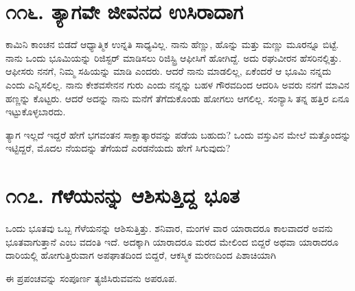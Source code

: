 \section{\num{೧೧೬. } ತ್ಯಾಗವೇ ಜೀವನದ ಉಸಿರಾದಾಗ}

ಕಾಮಿನಿ ಕಾಂಚನ ಬಿಡದೆ ಆಧ್ಯಾತ್ಮಿಕ ಉನ್ನತಿ ಸಾಧ್ಯವಿಲ್ಲ. ನಾನು ಹೆಣ್ಣು, ಹೊನ್ನು ಮತ್ತು ಮಣ್ಣು ಮೂರನ್ನೂ ಬಿಟ್ಟೆ. ನಾನು ಒಂದು ಭೂಮಿಯನ್ನು ರಿಜಿಸ್ಟರ್ ಮಾಡಿಸಲು ರಿಜಿಸ್ಟ್ರಿ ಆಫೀಸಿಗೆ ಹೋಗಿದ್ದೆ. ಅದು ರಘುವೀರನ ಹೆಸರಿನಲ್ಲಿತ್ತು. ಆಫೀಸರು ನನಗೆ, ನಿಮ್ಮ ಸಹಿಯನ್ನು ಮಾಡಿ ಎಂದರು. ಆದರೆ ನಾನು ಮಾಡಲಿಲ್ಲ, ಏಕೆಂದರೆ ಆ ಭೂಮಿ ನನ್ನದು ಎಂದು ಎನ್ನಿಸಲಿಲ್ಲ. ನಾನು ಕೇಶವಸೇನನ ಗುರು ಎಂದು ನನ್ನನ್ನು ಬಹಳ ಗೌರವದಿಂದ ಆದರಿಸಿ ಅವರು ನನಗೆ ಮಾವಿನ ಹಣ್ಣನ್ನು ಕೊಟ್ಟರು. ಆದರೆ ಅದನ್ನು ನಾನು ಮನೆಗೆ ತೆಗೆದುಕೊಂಡು ಹೋಗಲು ಆಗಲಿಲ್ಲ. ಸಂನ್ಯಾಸಿ ತನ್ನ ಹತ್ತಿರ ಏನೂ ಇಟ್ಟುಕೊಳ್ಳಬಾರದು.

ತ್ಯಾಗ ಇಲ್ಲದೆ ಇದ್ದರೆ ಹೇಗೆ ಭಗವಂತನ ಸಾಕ್ಷಾತ್ಕಾರವನ್ನು ಪಡೆಯ ಬಹುದು? ಒಂದು ವಸ್ತುವಿನ ಮೇಲೆ ಮತ್ತೊಂದನ್ನು ಇಟ್ಟಿದ್ದರೆ, ಮೊದಲ ನೆಯದನ್ನು ತೆಗೆಯದೆ ಎರಡನೆಯದು ಹೇಗೆ ಸಿಗುವುದು?


\section{\num{೧೧೭. } ಗೆಳೆಯನನ್ನು ಆಶಿಸುತ್ತಿದ್ದ ಭೂತ}

ಒಂದು ಭೂತವು ಒಬ್ಬ ಗೆಳೆಯನನ್ನು ಆಶಿಸುತ್ತಿತ್ತು. ಶನಿವಾರ, ಮಂಗಳ ವಾರ ಯಾರಾದರೂ ಕಾಲವಾದರೆ ಅವನು ಭೂತವಾಗುತ್ತಾನೆ ಎಂಬ ವದಂತಿ ಇದೆ. ಅದಕ್ಕಾಗಿ ಯಾರಾದರೂ ಮರದ ಮೇಲಿಂದ ಬಿದ್ದರೆ ಅಥವಾ ಯಾರಾದರೂ ದಾರಿಯಲ್ಲಿ ಹೋಗುತ್ತಿರುವಾಗ ಅಪಘಾತದಿಂದ ಬಿದ್ದರೆ, ಆಕಸ್ಮಿಕ ಮರಣದಿಂದ ಪಿಶಾಚಿಯಾಗಿ

ಈ ಪ್ರಪಂಚವನ್ನು ಸಂಪೂರ್ಣ ತ್ಯಜಿಸಿರುವವನು ಅಪರೂಪ.

